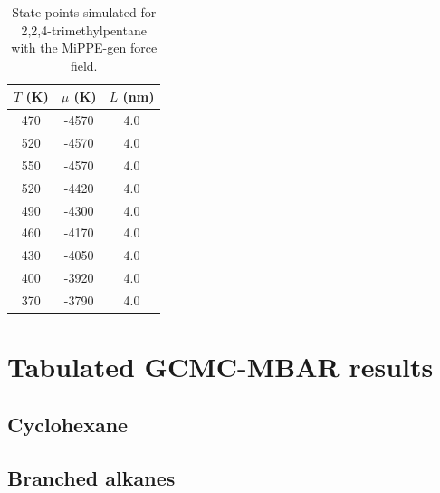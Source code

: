\documentclass[journal=jctc,manuscript=article]{achemso}
\begin{document}
\begin{table}[htb!]
	\caption{State points simulated for 2,2,4-trimethylpentane with the MiPPE-gen force field.}
	\begin{center}
		\begin{tabular}{|c|c|c|}
			\hline
			$T$ (K) & $\mu$ (K) & $L$ (nm) \\ \hline
			470	&	-4570	&	4.0	\\
			520	&	-4570	&	4.0	\\
			550	&	-4570	&	4.0	\\
			520	&	-4420	&	4.0	\\
			490	&	-4300	&	4.0	\\
			460	&	-4170	&	4.0	\\
			430	&	-4050	&	4.0	\\
			400	&	-3920	&	4.0	\\
			370	&	-3790	&	4.0	\\
			\hline
		\end{tabular}
	\end{center}
\end{table}

\newpage
\clearpage

\section{Tabulated GCMC-MBAR results} \label{SI sec: Tabulated MBAR results}

\subsection{Cyclohexane}

\subsection{Branched alkanes}
\end{document}
